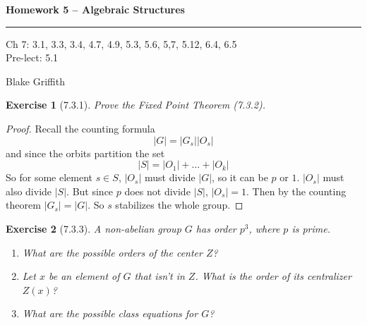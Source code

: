 \documentclass[12pt]{article}
\newtheorem*{exer}{Exercise}
\begin{document}
\textbf{Homework 5 -- Algebraic Structures} \\

\hrule

\begin{minipage}{.80\linewidth}
    \flushleft
    Ch 7: 3.1, 3.3, 3.4, 4.7, 4.9, 5.3, 5.6, 5,7, 5.12, 6.4, 6.5 \\
    Pre-lect: 5.1 \\
\end{minipage}
\begin{minipage}{.20\linewidth}
    \flushright
    Blake Griffith
\end{minipage}

\begin{exer}[7.3.1]

    Prove the Fixed Point Theorem (7.3.2).

\end{exer}

\begin{proof}

    Recall the counting formula
    \[
        |G| = |G_s||O_s|
    \]
    and since the orbits partition the set
    \[
        |S| = |O_1| + \dots + |O_k|
    \]
    So for some element $s \in S$, $|O_s|$ must divide $|G|$, so it can be
    $p$ or $1$. $|O_s|$ must also divide $|S|$. But since $p$ does not
    divide $|S|$, $|O_s| = 1$. Then by the counting theorem $|G_s| =
    |G|$. So $s$ stabilizes the whole group.

\end{proof}


\begin{exer}[7.3.3]

    A non-abelian group $G$ has order $p^3$, where $p$ is prime.

    \begin{enumerate}
        \item What are the possible orders of the center $Z$?

        \item Let $x$ be an element of $G$ that isn't in $Z$. What is
            the order of its centralizer $Z(x)$?

        \item What are the possible class equations for $G$?
    \end{enumerate}

\end{exer}
\end{document}
